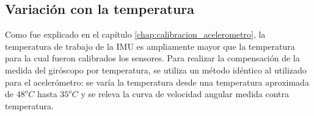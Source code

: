 \documentclass[main]{subfiles}
\begin{document}
%
%
%
%

\subsection{Variación con la temperatura}

Como fue explicado en el capítulo \ref{chap:calibracion_acelerometro}, la temperatura de trabajo de la IMU es ampliamente mayor que la temperatura para la cual fueron calibrados los sensores. Para realizar la compensación de la medida del giróscopo por temperatura, se utiliza un método idéntico al utilizado para el acelerómetro: se varía la temperatura desde una temperatura aproximada de $48^oC$ hasta $35^oC$ y se releva la curva de velocidad angular medida contra temperatura.
\end{document}
